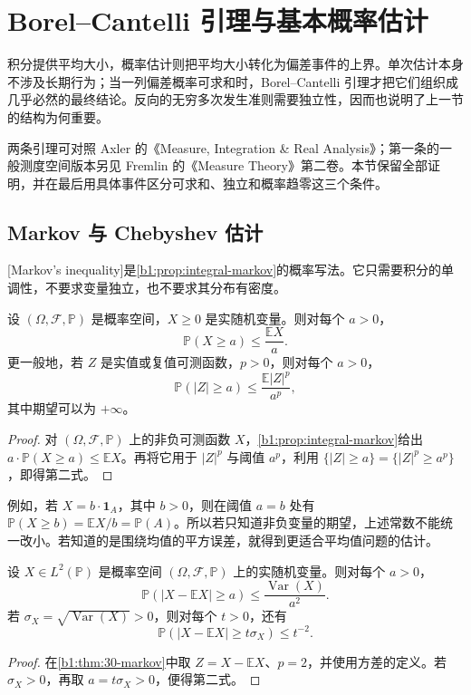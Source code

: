 \section{Borel–Cantelli 引理与基本概率估计}
\label{b1:sec:3003}

积分提供平均大小，概率估计则把平均大小转化为偏差事件的上界。单次估计本身不涉及长期行为；当一列偏差概率可求和时，Borel--Cantelli 引理才把它们组织成几乎必然的最终结论。反向的无穷多次发生准则需要独立性，因而也说明了上一节的结构为何重要。

\ProseParagraphBreak

两条引理可对照 Axler 的《Measure, Integration \& Real Analysis》\cite[Borel--Cantelli Lemma 12.6, relative of Borel--Cantelli Lemma 12.10, pp.~383, 385]{Axler2020Measure}；第一条的一般测度空间版本另见 Fremlin 的《Measure Theory》第二卷\cite[Lemma 273A]{Fremlin2016Measure}。本节保留全部证明，并在最后用具体事件区分可求和、独立和概率趋零这三个条件。

\subsection{Markov 与 Chebyshev 估计}
\label{b1:subsec:300301}

[Markov's inequality]是\cref{b1:prop:integral-markov}的概率写法。它只需要积分的单调性，不要求变量独立，也不要求其分布有密度。

\begin{theorem}[Markov]\label{b1:thm:30-markov}
设 \((\Omega,\mathcal F,\mathbb P)\) 是概率空间，\(X\geq0\) 是实随机变量。则对每个 \(a>0\)，
\[
 \mathbb P(X\geq a)\leq\frac{\mathbb E X}{a}.
\]
更一般地，若 \(Z\) 是实值或复值可测函数，\(p>0\)，则对每个 \(a>0\)，
\[
 \mathbb P(|Z|\geq a)\leq\frac{\mathbb E|Z|^p}{a^p},
\]
其中期望可以为 \(+\infty\)。
\end{theorem}
\begin{proof}
对 \((\Omega,\mathcal F,\mathbb P)\) 上的非负可测函数 \(X\)，\cref{b1:prop:integral-markov}给出 \(a\cdot\mathbb P(X\geq a)\leq\mathbb E X\)。再将它用于 \(|Z|^p\) 与阈值 \(a^p\)，利用 \(\{|Z|\geq a\}=\{|Z|^p\geq a^p\}\)，即得第二式。
\end{proof}

例如，若 \(X=b\cdot\mathbf1_A\)，其中 \(b>0\)，则在阈值 \(a=b\) 处有 \(\mathbb P(X\geq b)=\mathbb E X/b=\mathbb P(A)\)。所以若只知道非负变量的期望，上述常数不能统一改小。若知道的是围绕均值的平方误差，就得到更适合平均值问题的估计。

\begin{corollary}[Chebyshev]\label{b1:cor:30-chebyshev}
设 \(X\in L^2(\mathbb P)\) 是概率空间 \((\Omega,\mathcal F,\mathbb P)\) 上的实随机变量。则对每个 \(a>0\)，
\[
 \mathbb P(|X-\mathbb E X|\geq a)
 \leq\frac{\operatorname{Var}(X)}{a^2}.
\]
若 \(\sigma_X=\sqrt{\operatorname{Var}(X)}>0\)，则对每个 \(t>0\)，还有
\[
 \mathbb P(|X-\mathbb E X|\geq t\sigma_X)\leq t^{-2}.
\]
\end{corollary}
\begin{proof}
在\cref{b1:thm:30-markov}中取 \(Z=X-\mathbb E X\)、\(p=2\)，并使用方差的定义。若 \(\sigma_X>0\)，再取 \(a=t\sigma_X>0\)，便得第二式。
\end{proof}

